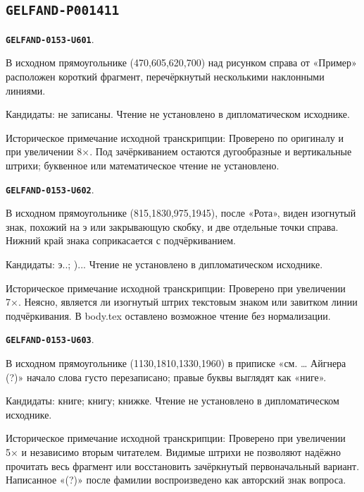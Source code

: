 \documentclass[11pt]{article}
\theoremstyle{definition}
\theoremstyle{remark}
\begin{document}
\subsection*{\texttt{GELFAND-P001411}}
\par\noindent\leavevmode{}\label{GELFAND-0153-U601}\label{GELFAND-P001411:example-cancelled:note}\textbf{\texttt{GELFAND-0153-U601}}.\nopagebreak[4]\par
В исходном прямоугольнике (470,605,620,700) над рисунком справа от «Пример» расположен короткий фрагмент, перечёркнутый несколькими наклонными линиями.\par
Кандидаты: не записаны. Чтение не установлено в дипломатическом исходнике.\par
Историческое примечание исходной транскрипции: Проверено по оригиналу и при увеличении 8×. Под зачёркиванием остаются дугообразные и вертикальные штрихи; буквенное или математическое чтение не установлено.\par\medskip
\par\noindent\leavevmode{}\label{GELFAND-0153-U602}\label{GELFAND-P001411:book-after-rota:note}\textbf{\texttt{GELFAND-0153-U602}}.\nopagebreak[4]\par
В исходном прямоугольнике (815,1830,975,1945), после «Рота», виден изогнутый знак, похожий на э или закрывающую скобку, и две отдельные точки справа. Нижний край знака соприкасается с подчёркиванием.\par
Кандидаты: э..; )... Чтение не установлено в дипломатическом исходнике.\par
Историческое примечание исходной транскрипции: Проверено при увеличении 7×. Неясно, является ли изогнутый штрих текстовым знаком или завитком линии подчёркивания. В body.tex оставлено возможное чтение без нормализации.\par\medskip
\par\noindent\leavevmode{}\label{GELFAND-0153-U603}\label{GELFAND-P001411:book-overwritten-noun:note}\textbf{\texttt{GELFAND-0153-U603}}.\nopagebreak[4]\par
В исходном прямоугольнике (1130,1810,1330,1960) в приписке «см. … Айгнера (?)» начало слова густо перезаписано; правые буквы выглядят как «ниге».\par
Кандидаты: книге; книгу; книжке. Чтение не установлено в дипломатическом исходнике.\par
Историческое примечание исходной транскрипции: Проверено при увеличении 5× и независимо вторым читателем. Видимые штрихи не позволяют надёжно прочитать весь фрагмент или восстановить зачёркнутый первоначальный вариант. Написанное «(?)» после фамилии воспроизведено как авторский знак вопроса.\par\medskip
\end{document}
